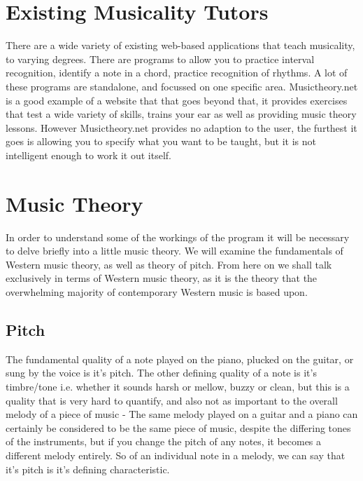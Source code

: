 	\section{Existing Musicality Tutors}
	
	There are a wide variety of existing web-based applications that teach musicality, to varying degrees. There are programs to allow you to practice interval recognition\cite{intervalEarTrainer}, identify a note in a chord, practice recognition of rhythms\cite{rhythmTrainer}. A lot of these programs are standalone, and focussed on one specific area. Musictheory.net\cite{musicTheorynet} is a good example of a website that that goes beyond that, it provides exercises that test a wide variety of skills, trains your ear as well as providing music theory lessons. However Musictheory.net provides no adaption to the user, the furthest it goes is allowing you to specify what you want to be taught, but it is not intelligent enough to work it out itself.
	\section{Music Theory}
	In order to understand some of the workings of the program it will be necessary to delve briefly into a little music theory. We will examine the fundamentals of Western music theory, as well as theory of pitch. From here on we shall talk exclusively in terms of Western music theory, as it is the theory that the overwhelming majority of contemporary Western music is based upon.
	\subsection{Pitch}
	The fundamental quality of a note played on the piano, plucked on the guitar, or sung by the voice is it's pitch. The other defining quality of a note is it's timbre/tone i.e. whether it sounds harsh or mellow, buzzy or clean, but this is a quality that is very hard to quantify, and also not as important to the overall melody of a piece of music - The same melody played on a guitar and a piano can certainly be considered to be the same piece of music, despite the differing tones of the instruments, but if you change the pitch of any notes, it becomes a different melody entirely. So of an individual note in a melody, we can say that it's pitch is it's defining characteristic.
	
